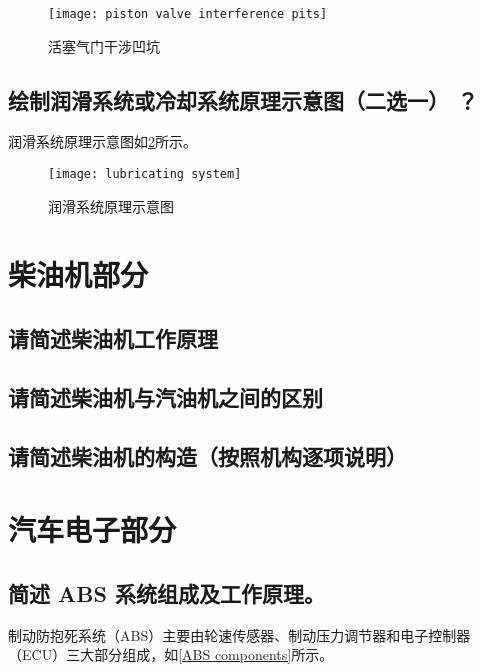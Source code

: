\documentclass[UTF8]{ctexart}
\numberwithin{figure}{section}
\numberwithin{table}{section}
\begin{document}
\begin{figure}[htbp]
	\centering
	\begin{minipage}[b]{0.4\textwidth}
		\centering
		\texttt{[image: piston valve interference pits]}
		\caption{活塞气门干涉凹坑}
		\label{piston valve interference pits}
	\end{minipage}
\end{figure}

\subsection{绘制润滑系统或冷却系统原理示意图（二选一） ？}

润滑系统原理示意图如\cref{lubricating system}所示。

\begin{figure}[htbp]
	\centering
	\begin{minipage}[b]{\textwidth}
		\centering
		\texttt{[image: lubricating system]}
		\caption{润滑系统原理示意图}
		\label{lubricating system}
	\end{minipage}
\end{figure}

\clearpage

\section{柴油机部分}
\subsection{请简述柴油机工作原理}
\subsection{请简述柴油机与汽油机之间的区别}
\subsection{请简述柴油机的构造（按照机构逐项说明）}
\clearpage

\section{汽车电子部分}
\subsection{简述 ABS 系统组成及工作原理。}

制动防抱死系统（ABS）主要由轮速传感器、制动压力调节器和电子控制器（ECU）三大部分组成，如\cref{ABS components}所示。
\end{document}
